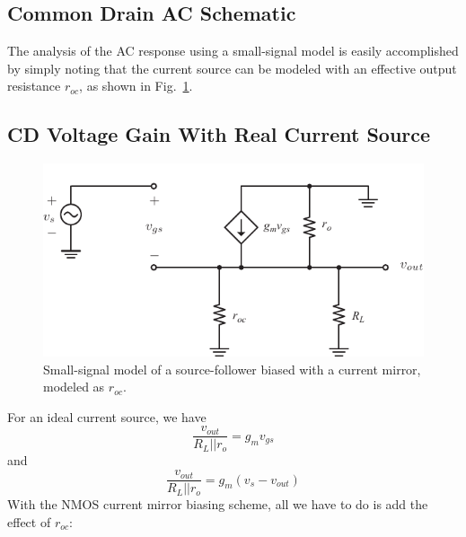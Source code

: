 \subsection{Common Drain AC Schematic}
The analysis of the AC response using a small-signal model is easily accomplished by simply noting that the current source can be modeled with an effective output resistance $r_{oc}$, as shown in Fig.~\ref{fig:cd_amp_ss_av.pdf}.
\subsection{CD Voltage Gain With Real Current Source}
\begin{figure}[tb]
\centering
\includegraphics[scale=1]{cd_amp_ss_av.pdf}
\caption{Small-signal model of a source-follower biased with a current mirror, modeled as $r_{oc}$.} \label{fig:cd_amp_ss_av.pdf}
\end{figure}
For an ideal current source, we have
    \begin{equation}
        \frac{{{v_{out}}}}{{{R_L}||{r_o}}} = {g_m}{v_{gs}}
    \end{equation}
and
    \begin{equation}
        \frac{{{v_{out}}}}{{{R_L}||{r_o}}} = {g_m}\left( {{v_{s}} - {v_{out}}} \right)
    \end{equation}
With the NMOS current mirror biasing scheme, all we have to do is add the effect of $r_{oc}$: 
